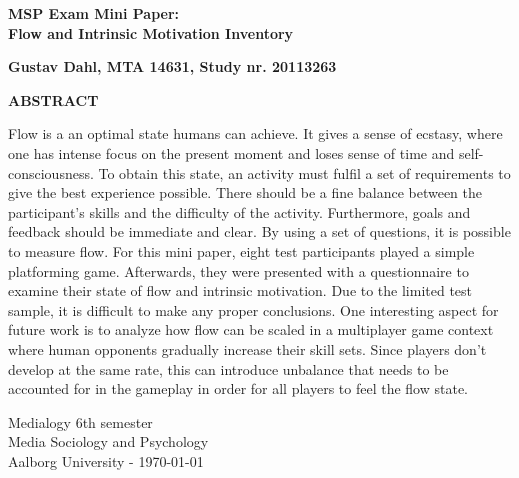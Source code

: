 \thispagestyle{empty} %
\hspace{6cm} \vspace{0.1cm}
\begin{center}
\textbf{\huge {MSP Exam Mini Paper:\\Flow and Intrinsic Motivation Inventory}}\\ \vspace{1cm}

\Large{\textbf{Gustav Dahl, MTA 14631, Study nr. 20113263}}

\textbf{ABSTRACT}

Flow is a an optimal state humans can achieve. It gives a sense of ecstasy, where one has intense focus on the present moment and loses sense of time and self-consciousness. To obtain this state, an activity must fulfil a set of requirements to give the best experience possible. There should be a fine balance between the participant's skills and the difficulty of the activity. Furthermore, goals and feedback should be immediate and clear. By using a set of questions, it is possible to measure flow. For this mini paper, eight test participants played a simple platforming game. Afterwards, they were presented with a questionnaire to examine their state of flow and intrinsic motivation. Due to the limited test sample, it is difficult to make any proper conclusions. One interesting aspect for future work is to analyze how flow can be scaled in a multiplayer game context where human opponents gradually increase their skill sets. Since players don't develop at the same rate, this can introduce unbalance that needs to be accounted for in the gameplay in order for all players to feel the flow state.

\end{center}
\vfill
Medialogy 6th semester\\
Media Sociology and Psychology\\
Aalborg University - \today